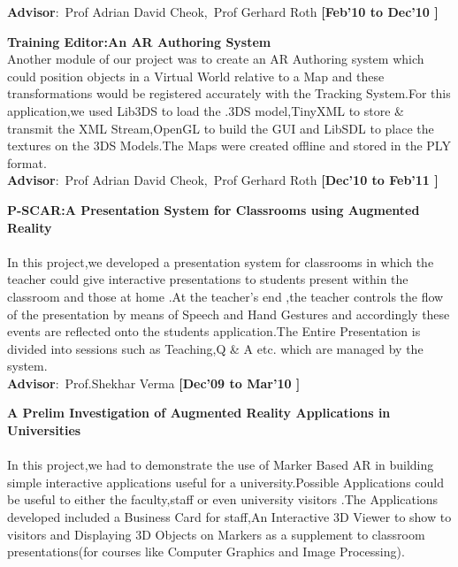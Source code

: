 \documentclass[10pt]{article}
\newcommand{\blankline}{\quad\pagebreak[2]}
\begin{document}
\textbf {Advisor}:~Prof Adrian David Cheok,~Prof Gerhard Roth \hfill\textbf{ [Feb'10 to Dec'10 ] }

\blankline

\textbf {Training Editor:An AR Authoring System}\\%
 
Another module of our project was to create an AR Authoring system which could position objects in a Virtual World relative to a Map and these transformations would be 
registered accurately with the Tracking System.For this application,we used Lib3DS to load the .3DS model,TinyXML to store \& transmit the XML Stream,OpenGL to build the GUI and LibSDL 
to place the textures on the 3DS Models.The Maps were created offline and stored in the PLY format.
\\ 

\textbf {Advisor}:~Prof Adrian David Cheok,~Prof Gerhard Roth \hfill\textbf{ [Dec'10 to Feb'11 ] }


 \blankline

\textbf {P-SCAR:A Presentation System for Classrooms using Augmented Reality} \\\\
    In this project,we developed a presentation system for classrooms in which the teacher could give interactive presentations to students present within the classroom and those at home
.At the teacher's end ,the teacher controls the flow of the presentation by means of Speech and Hand Gestures and accordingly these events are reflected onto the students application.The Entire Presentation is divided into sessions such as Teaching,Q \& A etc. which are managed by the system. 
\\

\textbf {Advisor}:~Prof.Shekhar Verma \hfill\textbf{ [Dec'09 to Mar'10 ]}

\blankline 

\textbf {A Prelim Investigation of Augmented Reality Applications in Universities}\\\\
In this project,we had to demonstrate the use of Marker Based AR in building simple interactive applications useful for a university.Possible Applications could be useful to either the faculty,staff or even university visitors 
.The Applications developed included a Business Card for staff,An Interactive 3D Viewer to show to visitors and Displaying 3D Objects on Markers as a supplement to classroom presentations(for courses like Computer Graphics and Image Processing).\\
\end{document}
